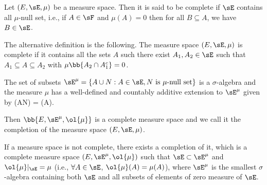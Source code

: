 \begin{definition}\label{def:complete_measure_space}%
Let $(E,\sE,\mu)$ be a measure space. Then it is said to be complete if $\sE$ contains all $\mu$-null set, i.e., if $A\in \sF$ and $\mu(A)=0$ then for all $B\subseteq A$, we have $B\in \sE$.
\end{definition}%

\begin{remark}
The alternative definition is the following. The measure space $(E,\sE,\mu)$ is complete if it contains all the sets $A$ such there exist $A_1,A_2\in \sE$ such that $A_1\subseteq A \subseteq A_2$ with $\mu\bb{A_2\cap A_1^c} = 0$.
\end{remark}

\begin{theorem}\label{thm:completion_of_measure}%
The set of subsets $\sE^\mu = \{A\cup N: A\in \sE, N \text{ is $\mu$-null set}\}$ is a $\sigma$-algebra and the measure $\mu$ has a well-defined and countably additive extension to $\sE^\mu$ given by
\be
\ol{\mu}(A\cup N) = \mu(A).
\ee %

Then $\bb{E,\sE^\mu,\ol{\mu}}$ is a complete measure space and we call it the completion of the measure space $(E,\sE,\mu)$. %
\end{theorem}

\begin{remark}
If a measure space is not complete, there exists a completion of it, which is a complete measure space $(E,\sE^\mu,\ol{\mu})$ such that $\sE \subset\sE^\mu$ and $ \ol{\mu}|_\sE = \mu$ (i.e., $\forall A\in \sE$, $\ol{\mu}(A) = \mu (A)$), where $\sE^\mu$ is the smallest $\sigma$-algebra containing both $\sE$ and all subsets of elements of zero measure of $\sE$.
\end{remark}


